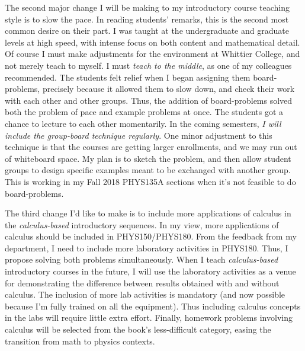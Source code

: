 \documentclass[../../main.tex]{subfiles}
\begin{document}
The second major change I will be making to my introductory course teaching style is to slow the pace.  In reading students' remarks, this is the second most common desire on their part.  I was taught at the undergraduate and graduate levels at high speed, with intense focus on both content and mathematical detail.  Of course I must make adjustments for the environment at Whittier College, and not merely teach to myself.  I must \textit{teach to the middle}, as one of my colleagues recommended.  The students felt relief when I began assigning them board-problems, precisely because it allowed them to slow down, and check their work with each other and other groups.  Thus, the addition of board-problems solved both the problem of pace and example problems at once.  The students got a chance to lecture to each other momentarily.  In the coming semesters, \textit{I will include the group-board technique regularly}. One minor adjustment to this technique is that the courses are getting larger enrollments, and we may run out of whiteboard space.  My plan is to sketch the problem, and then allow student groups to design specific examples meant to be exchanged with another group.  This is working in my Fall 2018 PHYS135A sections when it's not feasible to do board-problems.  \\ \hspace{0.1cm}

The third change I'd like to make is to include more applications of calculus in the \textit{calculus-based} introductory sequences.  In my view, more applications of calculus should be included in PHYS150/PHYS180.  From the feedback from my department, I need to include more laboratory activities in PHYS180.  Thus, I propose solving both problems simultaneously.  When I teach \textit{calculus-based} introductory courses in the future, I will use the laboratory activities as a venue for demonstrating the difference between results obtained with and without calculus.  The inclusion of more lab activities is mandatory (and now possible because I'm fully trained on all the equipment).  Thus including calculus concepts in the labs will require little extra effort.  Finally, homework problems involving calculus will be selected from the book's less-difficult category, easing the transition from math to physics contexts. \\ \hspace{0.1cm}
\end{document}
